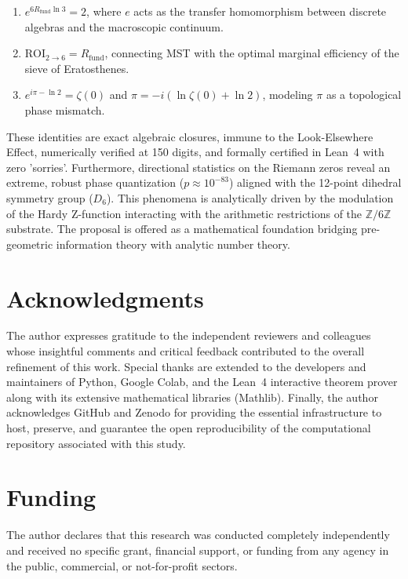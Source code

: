 \documentclass[10pt,a4paper]{article}
\newcommand{\Rfund}{R_{\text{fund}}}
\begin{document}
\begin{enumerate}
    \item \(e^{6\Rfund\ln 3} = 2\), where \(e\) acts as the transfer homomorphism between discrete algebras and the macroscopic continuum.
    \item \(\mathrm{ROI}_{2 \to 6} = \Rfund\), connecting MST with the optimal marginal efficiency of the sieve of Eratosthenes.
    \item \(e^{i\pi - \ln 2} = \zeta(0)\) and \(\pi = -i(\ln\zeta(0) + \ln 2)\), modeling \(\pi\) as a topological phase mismatch.
\end{enumerate}

These identities are exact algebraic closures, immune to the Look-Elsewhere Effect, numerically verified at 150 digits, and formally certified in Lean~4 with zero 'sorries'. Furthermore, directional statistics on the Riemann zeros reveal an extreme, robust phase quantization (\(p \approx 10^{-83}\)) aligned with the 12-point dihedral symmetry group (\(D_6\)). This phenomena is analytically driven by the modulation of the Hardy Z-function interacting with the arithmetic restrictions of the \(\mathbb{Z}/6\mathbb{Z}\) substrate. The proposal is offered as a mathematical foundation bridging pre-geometric information theory with analytic number theory.

\section*{Acknowledgments}
The author expresses gratitude to the independent reviewers and colleagues whose insightful comments and critical feedback contributed to the overall refinement of this work.
Special thanks are extended to the developers and maintainers of Python, Google Colab, and the Lean~4 interactive theorem prover along with its extensive mathematical libraries (Mathlib).
Finally, the author acknowledges GitHub and Zenodo for providing the essential infrastructure to host, preserve, and guarantee the open reproducibility of the computational repository associated with this study.

\section*{Funding}
The author declares that this research was conducted completely independently and received no specific grant, financial support, or funding from any agency in the public, commercial, or not-for-profit sectors.
\end{document}
